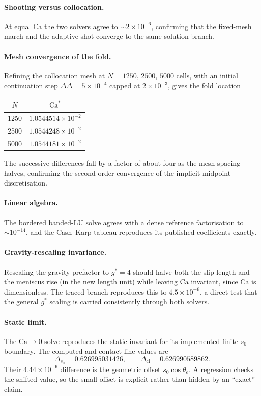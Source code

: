 \documentclass[11pt,a4paper]{article}
\newcommand{\Ca}{\mathrm{Ca}}
\begin{document}
\paragraph{Shooting versus collocation.}
At equal $\Ca$ the two solvers agree to $\sim 2\times10^{-6}$, confirming that
the fixed-mesh march and the adaptive shot converge to the same solution branch.

\paragraph{Mesh convergence of the fold.}
Refining the collocation mesh at $N = 1250$, $2500$, $5000$ cells, with an
initial continuation step $\Delta\Delta=5\times10^{-4}$ capped at
$2\times10^{-3}$, gives the fold location
\begin{center}
\begin{tabular}{cc}
  \toprule
  $N$ & $\Ca^{*}$ \\
  \midrule
  1250 & $1.0544514\times10^{-2}$ \\
  2500 & $1.0544248\times10^{-2}$ \\
  5000 & $1.0544181\times10^{-2}$ \\
  \bottomrule
\end{tabular}
\end{center}
The successive differences fall by a factor of about four as the mesh spacing
halves, confirming the second-order convergence of the implicit-midpoint
discretisation.

\paragraph{Linear algebra.}
The bordered banded-LU solve agrees with a dense reference factorisation to
$\sim 10^{-14}$, and the Cash--Karp tableau reproduces its published
coefficients exactly.

\paragraph{Gravity-rescaling invariance.}
Rescaling the gravity prefactor to $g^{*} = 4$ should halve both the slip
length and the meniscus rise (in the new length unit) while leaving $\Ca$
invariant, since $\Ca$ is dimensionless. The traced branch reproduces this to
$4.5\times10^{-6}$, a direct test that the general $g^{*}$ scaling is carried
consistently through both solvers.

\paragraph{Static limit.}
The $\Ca \to 0$ solve reproduces the static invariant for its implemented
finite-$s_0$ boundary. The computed and contact-line values are
\[
  \Delta_{s_0}=0.626995031426, \qquad
  \Delta_{\mathrm{cl}}=0.626990589862.
\]
Their $4.44\times10^{-6}$ difference is the geometric offset
$s_0\cos\theta_e$. A regression checks the shifted value, so the small offset
is explicit rather than hidden by an ``exact'' claim.
\end{document}
